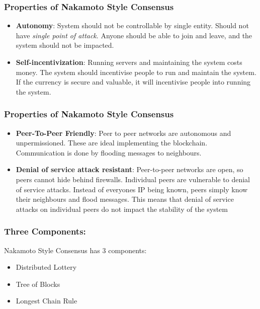     \begin{frame}
        \frametitle{Properties of Nakamoto Style Consensus}
            \begin{itemize}
                \item \textbf{Autonomy}: System should not be controllable by single entity. Should not have \textit{single point of attack}. Anyone should be able to join and leave, and the system should not be impacted.
                \item \textbf{Self-incentivization}: Running servers and maintaining the system costs money. The system should incentivise people to run and maintain 
                the system. If the currency is secure and valuable, it will incentivise people into running the system.
            \end{itemize}
    \end{frame}
    \begin{frame}
        \frametitle{Properties of Nakamoto Style Consensus}
            \begin{itemize}
                \item \textbf{Peer-To-Peer Friendly}: Peer to peer networks are autonomous and unpermissioned. These are ideal implementing the blockchain. Communication is done by flooding messages to neighbours. 
                \item \textbf{Denial of service attack resistant}: Peer-to-peer networks are open, so peers cannot hide behind firewalls. Individual peers are vulnerable to denial of service attacks. Instead of everyones IP being known, peers simply know their neighbours and flood messages. This means that denial of service attacks on individual peers do not impact the stability of the system
            \end{itemize}
        
    
    \end{frame}

        \begin{frame}
            \frametitle{Three Components:}
                Nakamoto Style Consensus has 3 components: 
                \begin{itemize}
                    \item Distributed Lottery
                    \item Tree of Blocks
                    \item Longest Chain Rule
                \end{itemize}
        \end{frame}


